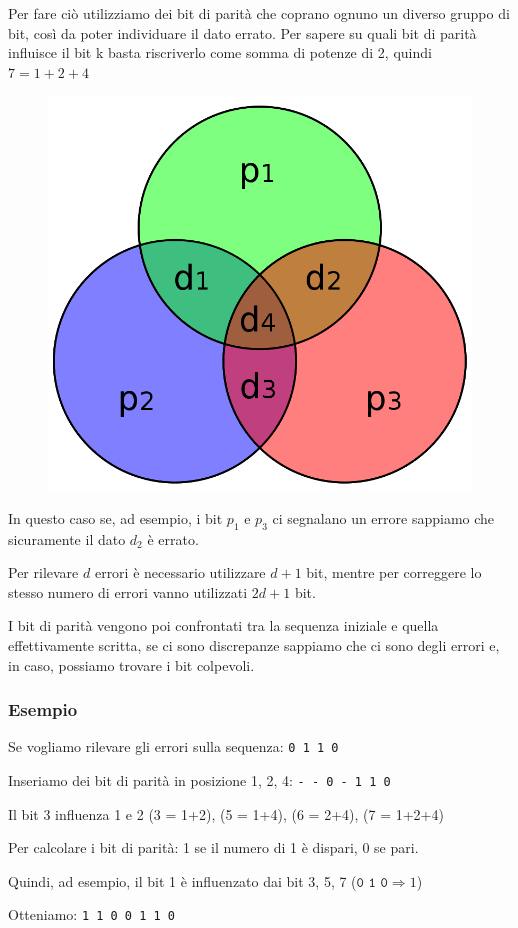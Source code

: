 Per fare ciò utilizziamo dei bit di parità che coprano ognuno un diverso gruppo di bit, così da poter individuare il dato errato.
Per sapere su quali bit di parità influisce il bit k basta riscriverlo come somma di potenze di 2, quindi $7 = 1 + 2 + 4$

\begin{figure}[H]
    \centering
    \includegraphics[width=0.35\linewidth]{assets/hamming-diagram.png}
\end{figure}

In questo caso se, ad esempio, i bit $p_1$ e $p_3$ ci segnalano un errore sappiamo che sicuramente il dato $d_2$ è errato.

\spacer
Per rilevare $d$ errori è necessario utilizzare $d+1$ bit, mentre per correggere lo stesso numero di errori vanno utilizzati $2d+1$ bit.

I bit di parità vengono poi confrontati tra la sequenza iniziale e quella effettivamente scritta, se ci sono discrepanze sappiamo che ci sono degli errori e, in caso, possiamo trovare i bit colpevoli.


\subsubsection*{Esempio}
Se vogliamo rilevare gli errori sulla sequenza: \texttt{0 1 1 0}

\spacer
Inseriamo dei bit di parità in posizione 1, 2, 4: \texttt{- - 0 - 1 1 0}

Il bit 3 influenza 1 e 2 (3 = 1+2), (5 = 1+4), (6 = 2+4), (7 = 1+2+4)

\spacer
Per calcolare i bit di parità: 1 se il numero di 1 è dispari, 0 se pari.

Quindi, ad esempio, il bit 1 è influenzato dai bit 3, 5, 7 ($\texttt{0 1 0} \Rightarrow 1$)

Otteniamo: \texttt{1 1 0 0 1 1 0}
